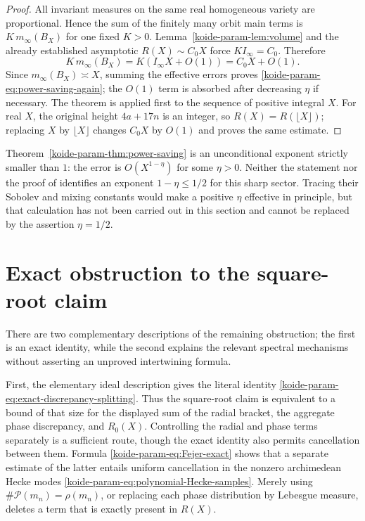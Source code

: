 \begin{proof}
All invariant measures on the same real homogeneous variety are
proportional.  Hence the sum of the finitely many orbit main terms is
$K\,m_\infty(B_X)$ for one fixed $K>0$.  Lemma~\ref{koide-param-lem:volume} and the
already established asymptotic $R(X)\sim C_0X$ force
$K I_\infty=C_0$.  Therefore
\[
 K\,m_\infty(B_X)=K(I_\infty X+O(1))=C_0X+O(1).
\]
Since $m_\infty(B_X)\asymp X$, summing the effective errors proves
\eqref{koide-param-eq:power-saving-again}; the $O(1)$ term is absorbed after decreasing
$\eta$ if necessary.  The theorem is applied first to the sequence of
positive integral $X$.  For real $X$, the original height $4a+17n$ is an
integer, so $R(X)=R(\lfloor X\rfloor)$; replacing $X$ by $\lfloor X\rfloor$
changes $C_0X$ by $O(1)$ and proves the same estimate.
\end{proof}

\begin{remark}
Theorem~\ref{koide-param-thm:power-saving} is an unconditional exponent strictly
smaller than $1$: the error is $O(X^{1-\eta})$ for some $\eta>0$.
Neither the statement nor the proof of \cite[Theorem~13.2]{BenoistOh_2012} identifies an exponent
$1-\eta\leq1/2$ for this sharp sector.  Tracing their Sobolev and mixing
constants would make a positive $\eta$ effective in principle, but that
calculation has not been carried out in this section and cannot be replaced
by the assertion $\eta=1/2$.
\end{remark}

\section{Exact obstruction to the square-root claim}

There are two complementary descriptions of the remaining obstruction;
the first is an exact identity, while the second explains the relevant
spectral mechanisms without asserting an unproved intertwining formula.

First, the elementary ideal description gives the literal identity
\eqref{koide-param-eq:exact-discrepancy-splitting}.  Thus the square-root claim is
equivalent to a bound of that size for the displayed sum of the radial
bracket, the aggregate phase discrepancy, and $R_0(X)$.  Controlling the
radial and phase terms separately is a sufficient route, though the exact
identity also permits cancellation between them.  Formula
\eqref{koide-param-eq:Fejer-exact} shows that a separate estimate of the latter entails
uniform cancellation in the nonzero archimedean Hecke modes
\eqref{koide-param-eq:polynomial-Hecke-samples}.  Merely using
\(\#\mathcal P(m_n)=\rho(m_n)\), or replacing each phase distribution by
Lebesgue measure, deletes a term that is exactly present in $R(X)$.

